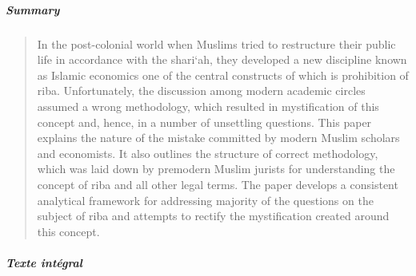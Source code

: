  \subparagraph{Summary}
  \begin{quote}
  In the post-colonial world when Muslims tried to restructure their public life in accordance with the shari‘ah, they developed a new discipline known as Islamic economics one of the central constructs of which is prohibition of riba. Unfortunately, the discussion among modern academic circles assumed a wrong methodology, which resulted in mystification of this concept and, hence, in a number of unsettling questions. This paper explains the nature of the mistake committed by modern Muslim scholars and economists. It also outlines the structure of correct methodology, which was laid down by premodern Muslim jurists for understanding the concept of riba and all other legal terms. The paper develops a consistent analytical framework for addressing majority of the questions on the subject of riba and attempts to rectify the mystification created around this concept.
  
  \end{quote}
 \subparagraph{Texte intégral}
